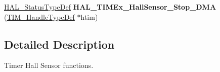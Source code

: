 \begin{DoxyCompactItemize}
\item 
\mbox{\label{group___t_i_m_ex___exported___functions___group1_gab361d1aa6e0eb244886b93908beded6f}} 
\mbox{\hyperlink{stm32f7xx__hal__def_8h_a63c0679d1cb8b8c684fbb0632743478f}{H\+A\+L\+\_\+\+Status\+Type\+Def}} {\bfseries H\+A\+L\+\_\+\+T\+I\+M\+Ex\+\_\+\+Hall\+Sensor\+\_\+\+Stop\+\_\+\+D\+MA} (\mbox{\hyperlink{struct_t_i_m___handle_type_def}{T\+I\+M\+\_\+\+Handle\+Type\+Def}} $\ast$htim)
\end{DoxyCompactItemize}


\subsection{Detailed Description}
Timer Hall Sensor functions. 

